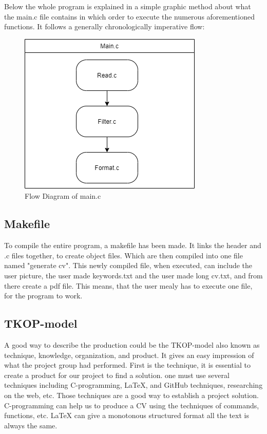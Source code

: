 Below the whole program is explained in a simple graphic method about what the main.c file contains 
in which order to execute the numerous aforementioned functions.
It follows a generally chronologically imperative flow:
\begin{figure}[H]
  \centering
  \includegraphics[scale = 0.6]{figures/main.png}
  \caption{Flow Diagram of main.c}
\end{figure}
\subsection{Makefile}
To compile the entire program, a makefile has been made. It links the header and .c files together, to create object files. Which are then compiled into one file named "generate cv".
This newly compiled file, when executed, can include the user picture, the user made keywords.txt and the user made long cv.txt, and from there create a pdf file.
This means, that the user mealy has to execute one file, for the program to work.

\subsection{TKOP-model}
A good way to describe the production could be the TKOP-model also known as technique, knowledge, organization, and product.
It gives an easy impression of what the project group had performed.
First is the technique, it is essential to create a product for our project to find a solution. 
one must use several techniques including C-programming, LaTeX, and GitHub techniques, researching on the web, etc.
Those techniques are a good way to establish a project solution. C-programming can help us to produce a CV using the techniques
of commands, functions, etc. LaTeX can give a monotonous structured format all the text is always the same. \\

